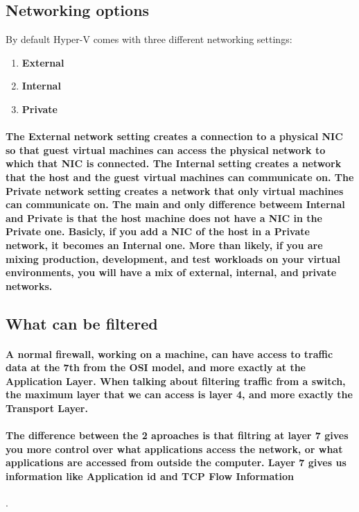 \subsection{Networking options}

By default Hyper-V comes with three different networking settings: 
\begin{enumerate}
\item \textbf{External}
\item \textbf{Internal}
\item \textbf{Private} 
\end{enumerate}

\paragraph{The \textbf{External} network setting creates a connection to a physical NIC so that guest virtual machines can access the physical network to which that NIC is connected. 
The \textbf{Internal} setting creates a network that the host and the guest virtual machines can communicate on. The \textbf{Private} network setting creates a network that only virtual 
machines can communicate on. The main and only difference betweem Internal and Private is that the host machine does not have a NIC in the Private one. Basicly, if you add a NIC of the 
host in a Private network, it becomes an Internal one. More than likely, if you are mixing production, development, and test workloads on your virtual environments, you will have a mix 
of external, internal, and private networks.}

\subsection{What can be filtered}

\paragraph{A normal firewall, working on a machine, can have access to traffic data at the 7th from the OSI model, and more exactly at the Application Layer.
When talking about filtering traffic from a switch, the maximum layer that we can access is layer 4, and more exactly the Transport Layer.}

\paragraph{The difference between the 2 aproaches is that filtring at layer 7 gives you more control over what applications access the network, or what applications
are accessed from outside the computer. Layer 7 gives us information like \textbf{Application id} and \textbf{TCP Flow Information}}.

